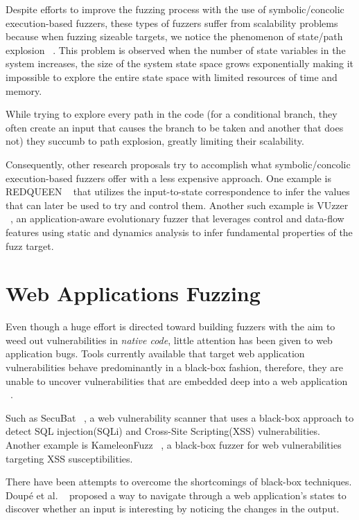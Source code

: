 Despite efforts to improve the fuzzing process with the use of symbolic/concolic execution-based fuzzers, these types of fuzzers suffer from scalability problems because when fuzzing sizeable targets, we notice the phenomenon of state/path explosion ~\cite{Clarke2012}. This problem is observed when the number of state variables in the system increases, the size of the system state space grows exponentially making it impossible to explore the entire state space with limited resources of time and memory. 

While trying to explore every path in the code (\ie for a conditional branch, they often create an input that causes the branch to be taken and another that does not) they succumb to path explosion, greatly limiting their scalability.

Consequently, other research proposals try to accomplish what symbolic/concolic execution-based fuzzers offer with a less expensive approach. One example is REDQUEEN ~\cite{aschermann2019redqueen} that utilizes the input-to-state correspondence to infer the values that can later be used to try and control them. Another such example is VUzzer ~\cite{rawat2017vuzzer}, an application-aware evolutionary fuzzer that leverages control and data-flow features using static and dynamics analysis to infer fundamental properties of the fuzz target.

\section{Web Applications Fuzzing}
Even though a huge effort is directed toward building fuzzers with the aim to weed out vulnerabilities in \emph{native code}, little attention has been given to web application bugs. Tools currently available that target web application vulnerabilities behave predominantly in a black-box fashion, therefore, they are unable to uncover vulnerabilities that are embedded deep into a web application ~\cite{bau2010state, doupe2010johnny}.
 
Such as SecuBat ~\cite{kals2006secubat}, a web vulnerability scanner that uses a black-box approach to detect SQL injection(SQLi) and Cross-Site Scripting(XSS) vulnerabilities. Another example is KameleonFuzz ~\cite{duchene2014kameleonfuzz}, a black-box fuzzer for web vulnerabilities targeting XSS susceptibilities.

There have been attempts to overcome the shortcomings of black-box techniques. Doupé et al. ~\cite{doupe2012enemy} proposed a way to navigate through a web application's states to discover whether an input is interesting by noticing the changes in the output. 

